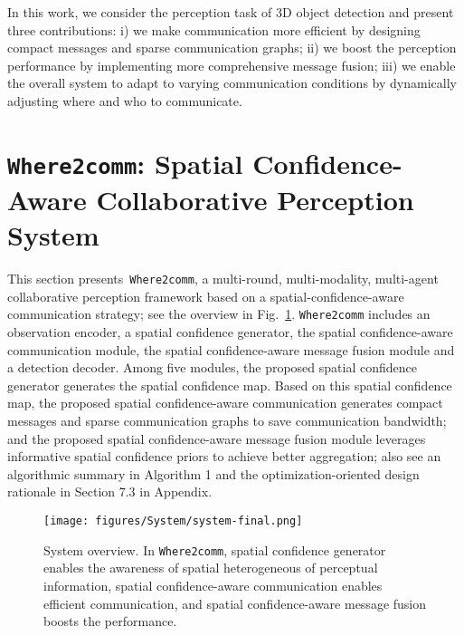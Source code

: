 \documentclass{article}
\begin{document}
In this work, we consider the perception task of 3D object detection and present three contributions: i) we make communication more efficient by designing compact messages and sparse communication graphs; ii) we boost the perception performance by implementing more comprehensive message fusion; iii) we enable the overall system to adapt to varying communication conditions by dynamically adjusting where and who to communicate.



\vspace{-2mm}
\section{\texttt{Where2comm}: Spatial Confidence-Aware Collaborative Perception System}
\vspace{-2mm}

This section presents~\texttt{Where2comm}, a multi-round, multi-modality, multi-agent collaborative perception framework based on a spatial-confidence-aware communication strategy; see the overview in Fig.~\ref{fig:system}. \texttt{Where2comm} includes an observation encoder, a spatial confidence generator, the spatial confidence-aware communication module, the spatial confidence-aware message fusion module and a detection decoder. Among five modules, the proposed spatial confidence generator generates the spatial confidence map. Based on this spatial confidence map, the proposed spatial confidence-aware communication generates compact messages and sparse communication graphs to save communication bandwidth; and the proposed spatial confidence-aware message fusion module leverages informative spatial confidence priors to achieve better aggregation; also see an algorithmic summary in Algorithm 1 and the optimization-oriented design rationale in Section 7.3 in Appendix.


\begin{figure}[!t]
    \centering
\texttt{[image: figures/System/system-final.png]}
\caption{System overview. In \texttt{Where2comm}, spatial confidence generator enables the awareness of spatial heterogeneous of perceptual information, spatial confidence-aware communication enables efficient communication, and spatial confidence-aware message fusion boosts the performance.}
    \label{fig:system}
    \vspace{-5mm}
\end{figure}

\vspace{-2mm}
\end{document}

